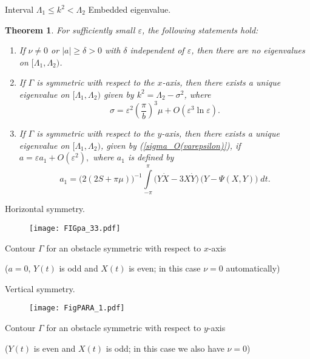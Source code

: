 \documentclass{beamer}
\newtheorem{teo}{Theorem}[section]
\begin{document}
\begin{frame}{Interval $\Lambda_1\leq k^2<\Lambda_2$ Embedded eigenvalue.}
\begin{teo}\label{a^{ast}+}
For sufficiently small $\varepsilon$, the following statements hold:
\begin{enumerate}
\item[(i)] If $\nu\neq 0$ or $|a|\geq\delta>0$ with $\delta$ independent of $\varepsilon$, then there are no eigenvalues on $[\Lambda_1,\Lambda_2)$.
\item[(ii)] If $\Gamma$ is symmetric with respect to the $x$-axis, then there exists a unique eigenvalue on $[\Lambda_1,\Lambda_2)$ given by $k^2=\Lambda_2-\sigma^2$, where
\begin{equation}\label{sigma_O(varepsilon)}
\sigma=\varepsilon^2\left(\frac{\pi}{b}\right)^3 \mu+O(\varepsilon^3\ln\varepsilon).
\end{equation}
\item[(iii)] If $\Gamma$ is symmetric with respect to the $y$-axis, then there exists a unique eigenvalue on $[\Lambda_1,\Lambda_2)$, given by (\ref{sigma_O(varepsilon)}), if $a=\varepsilon a_1+O(\varepsilon^2),$
where $a_1$ is defined by
\begin{equation}\label{fa1}
a_1=\Big(2(2S+\pi\mu)\Big)^{-1}\int\limits_{-\pi}^{\pi} \big(Y\dot{X}-3X\dot{Y}\big)\,\big(Y-\Psi(X,Y)\big)\;dt.
\end{equation}  
\end{enumerate}
\end{teo}
\end{frame}



\begin{frame}{Horizontal symmetry.}


\begin{figure}[htbp]
\centering
\texttt{[image: FIGpa\_33.pdf]}
\end{figure}
\centerline{Contour $\Gamma$ for an obstacle symmetric with respect to $x$-axis} 
\centerline{($a=0$, $Y(t)$ is odd and $X(t)$ is even; in this case $\nu=0$ automatically)}
\end{frame}






\begin{frame}{Vertical symmetry.}
\begin{figure}[htbp]
\centering
\texttt{[image: FigPARA\_1.pdf]}
\end{figure}
\centerline{Contour $\Gamma$ for an obstacle symmetric with respect to $y$-axis} 
\centerline{($Y(t)$ is even and $X(t)$ is odd; in this case we also have $\nu=0$)}
\end{frame}
\end{document}
